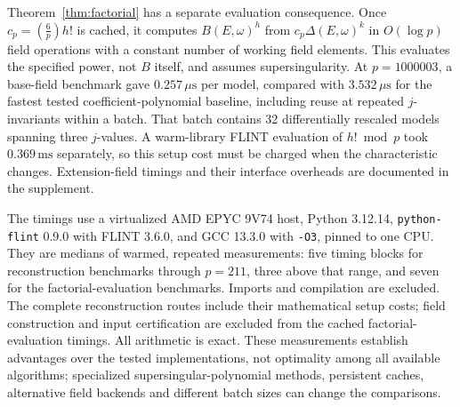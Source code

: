 \documentclass[11pt,a4paper]{article}
\numberwithin{equation}{section}
\theoremstyle{definition}
\theoremstyle{remark}
\newcommand{\Lp}[1]{\left(\frac{#1}{p}\right)}
\begin{document}
Theorem~\ref{thm:factorial} has a separate evaluation consequence. Once
$c_p=\Lp6h!$ is cached, it computes $B(E,\omega)^h$ from
$c_p\Delta(E,\omega)^k$ in $O(\log p)$ field operations with a constant
number of working field elements. This evaluates the specified power, not
$B$ itself, and assumes supersingularity. At $p=1000003$, a base-field
benchmark gave $0.257\,\mu\mathrm{s}$ per model, compared with
$3.532\,\mu\mathrm{s}$ for the fastest tested coefficient-polynomial
baseline, including reuse at repeated $j$-invariants within a batch.
That batch contains 32 differentially rescaled models spanning three
$j$-values. A warm-library FLINT evaluation of $h!\bmod p$ took
$0.369\,\mathrm{ms}$ separately, so this setup cost must be charged when
the characteristic changes. Extension-field timings and their interface
overheads are documented in the supplement.

The timings use a virtualized AMD EPYC 9V74 host, Python 3.12.14,
\texttt{python-flint} 0.9.0 with FLINT 3.6.0, and GCC 13.3.0
with \texttt{-O3}, pinned to one CPU. They are medians of warmed,
repeated measurements: five timing blocks for reconstruction benchmarks
through $p=211$, three above that range, and seven for the factorial-evaluation
benchmarks. Imports and compilation are excluded. The complete reconstruction
routes include their mathematical setup costs; field construction and input
certification are excluded from the cached factorial-evaluation timings.
All arithmetic is exact. These measurements establish advantages over the
tested implementations, not optimality among all available algorithms;
specialized supersingular-polynomial methods, persistent caches, alternative
field backends and different batch sizes can change the comparisons.
\end{document}
